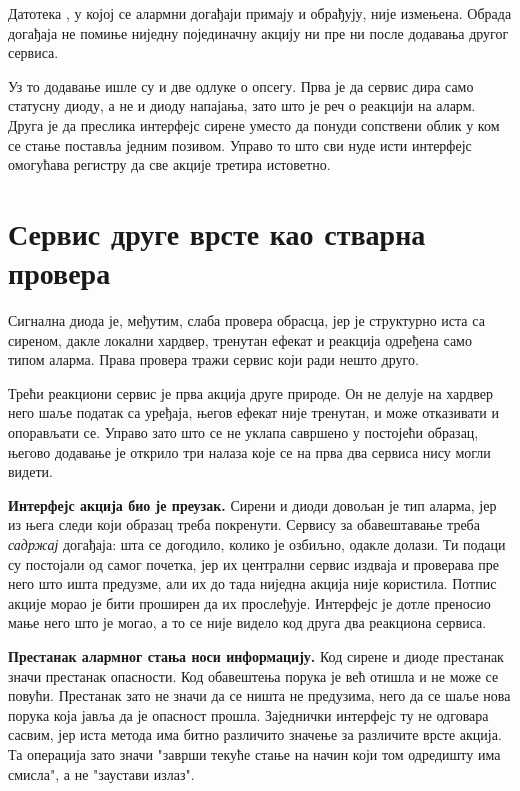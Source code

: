 \documentclass[12pt,oneside]{memoir}
\begin{document}
Датотека , у којој се алармни догађаји примају и обрађују, није
измењена. Обрада догађаја не помиње ниједну појединачну акцију ни пре ни после додавања
другог сервиса.

Уз то додавање ишле су и две одлуке о опсегу. Прва је да сервис дира само статусну диоду, а
не и диоду напајања,
зато што је реч о реакцији на аларм. Друга је да
 преслика интерфејс сирене уместо да понуди сопствени облик у ком се
стање поставља једним позивом. Управо то што сви нуде исти интерфејс омогућава регистру да
све акције третира истоветно.

\section{Сервис друге врсте као стварна провера}
\label{sec:mqtt-dokaz}

Сигнална диода је, међутим, слаба провера обрасца, јер је структурно иста са сиреном,
дакле локални хардвер, тренутан ефекат и реакција одређена само типом аларма. Права провера
тражи сервис који ради нешто друго.

Трећи реакциони сервис је прва акција друге природе. Он не делује на хардвер него шаље
податак са уређаја, његов ефекат није тренутан, и може отказивати и опорављати се. Управо
зато што се не уклапа савршено у постојећи образац, његово додавање је открило три налаза
које се на прва два сервиса нису могли видети.

\textbf{Интерфејс акција био је преузак.} Сирени и диоди довољан је тип аларма, јер из њега
следи који образац треба покренути. Сервису за обавештавање треба \emph{садржај} догађаја:
шта се догодило, колико је озбиљно, одакле долази. Ти подаци су постојали од самог почетка,
јер их централни сервис издваја и проверава пре него што ишта предузме, али их до тада
ниједна акција није користила. Потпис акције морао је бити проширен да их прослеђује.
Интерфејс је дотле преносио мање него што је могао, а то се није видело код друга два реакциона сервиса.

\textbf{Престанак алармног стања носи информацију.} Код сирене и диоде престанак значи
престанак опасности. Код обавештења порука је већ отишла и не
може се повући. Престанак зато не значи да се ништа
не предузима, него да се шаље нова порука која јавља да је опасност прошла. Заједнички интерфејс ту не одговара сасвим, јер
иста метода има битно различито значење за различите врсте акција.
Та операција зато значи "заврши текуће стање на начин који том одредишту има смисла", а не
"заустави излаз".
\end{document}
